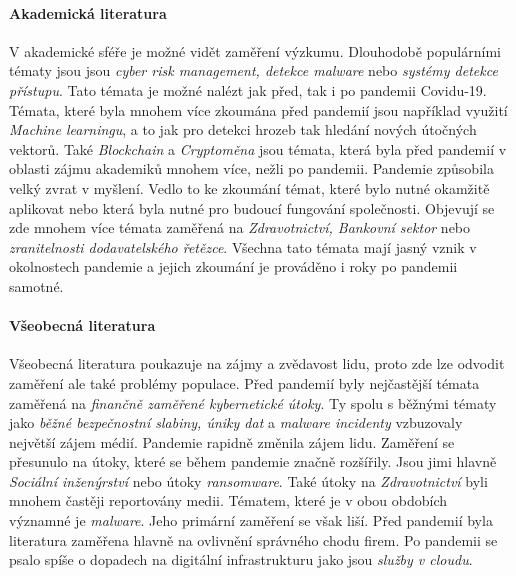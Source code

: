 \paragraph{Akademická literatura}
V akademické sféře je možné vidět zaměření výzkumu.
Dlouhodobě populárními tématy jsou jsou \textit{cyber risk management, detekce malware} nebo \textit{systémy detekce přístupu}.\cite{KUMAR2022102821}
Tato témata je možné nalézt jak před, tak i po pandemii Covidu-19.
Témata, které byla mnohem více zkoumána před pandemií jsou například využití \textit{Machine learningu}, a to jak pro detekci hrozeb tak hledání nových útočných vektorů.
Také \textit{Blockchain} a \textit{Cryptoměna} jsou témata, která byla před pandemií v oblasti zájmu akademiků mnohem více, nežli po pandemii.\cite{KUMAR2022102821}
Pandemie způsobila velký zvrat v myšlení.
Vedlo to ke zkoumání témat, které bylo nutné okamžitě aplikovat nebo která byla nutné pro budoucí fungování společnosti.
Objevují se zde mnohem více témata zaměřená na \textit{Zdravotnictví, Bankovní sektor} nebo \textit{zranitelnosti dodavatelského řetězce}.\cite{KUMAR2022102821}
Všechna tato témata mají jasný vznik v okolnostech pandemie a jejich zkoumání je prováděno i roky po pandemii samotné.

\paragraph{Všeobecná literatura}
Všeobecná literatura poukazuje na zájmy a zvědavost lidu, proto zde lze odvodit zaměření ale také problémy populace.
Před pandemií byly nejčastější témata zaměřená na \textit{finančně zaměřené kybernetické útoky}.
Ty spolu s běžnými tématy jako \textit{běžné bezpečnostní slabiny, úniky dat} a \textit{malware incidenty} vzbuzovaly největší zájem médií.\cite{KUMAR2022102821}
Pandemie rapidně změnila zájem lidu.
Zaměření se přesunulo na útoky, které se během pandemie značně rozšířily.
Jsou jimi hlavně \textit{Sociální inženýrství} nebo útoky \textit{ransomware}.
Také útoky na \textit{Zdravotnictví} byli mnohem častěji reportovány medii.
Tématem, které je v obou obdobích významné je \textit{malware}.
Jeho primární zaměření se však liší.
Před pandemií byla literatura zaměřena hlavně na ovlivnění správného chodu firem.
Po pandemii se psalo spíše o dopadech na digitální infrastrukturu jako jsou \textit{služby v cloudu}.

